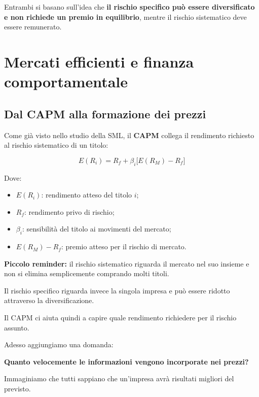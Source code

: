 \noindent Entrambi si basano sull'idea
che \textbf{il rischio specifico può essere
diversificato e non richiede un premio
in equilibrio}, mentre il rischio sistematico
deve essere remunerato.

\section{Mercati efficienti e finanza comportamentale}

\subsection{Dal CAPM alla formazione dei prezzi}

\noindent Come già visto nello studio della SML,
il \textbf{CAPM} collega il rendimento richiesto
al rischio sistematico di un titolo:

\[
\boxed{
E(R_i)=R_f+\beta_i\bigl[E(R_M)-R_f\bigr]
}
\]

\noindent Dove:

\begin{itemize}
    \item $E(R_i)$: rendimento atteso del titolo $i$;
    \item $R_f$: rendimento privo di rischio;
    \item $\beta_i$: sensibilità del titolo
    ai movimenti del mercato;
    \item $E(R_M)-R_f$: premio atteso
    per il rischio di mercato.
\end{itemize}

\medskip

\noindent \textbf{Piccolo reminder:}
il rischio sistematico riguarda il mercato
nel suo insieme e non si elimina semplicemente
comprando molti titoli.

\noindent Il rischio specifico riguarda invece
la singola impresa e può essere ridotto
attraverso la diversificazione.

\medskip

\noindent Il CAPM ci aiuta quindi a capire
quale rendimento richiedere per il rischio assunto.

\noindent Adesso aggiungiamo una domanda:

\begin{center}
    \textbf{Quanto velocemente le informazioni
    vengono incorporate nei prezzi?}
\end{center}

\noindent Immaginiamo che tutti sappiano
che un'impresa avrà risultati migliori del previsto.

